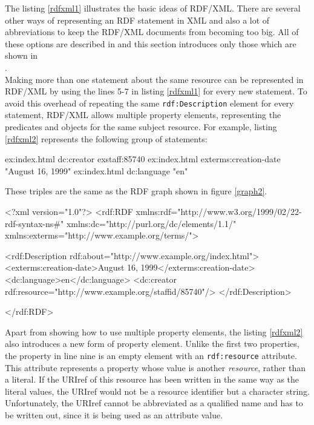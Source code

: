 \documentclass[11pt,a4paper,headsepline, bibtotoc]{scrreprt}
\begin{document}
The listing \ref{rdfxml1} illustrates the basic ideas of RDF/XML. There are several other ways of representing an RDF statement in XML and also a lot of abbreviations to keep the RDF/XML documents from becoming too big. All of these options are described in \cite{RDF:Syntax} and this section introduces only those which are shown in \\\cite{RDF:Primer}.
\\
Making more than one statement about the same resource can be represented in RDF/XML by using the lines 5-7 in listing \ref{rdfxml1} for every new statement. To avoid this overhead of repeating the same \texttt{rdf:Description} element for every statement, RDF/XML allows multiple property elements, representing the predicates and objects for the same subject resource. For example, listing \ref{rdfxml2} represents the following group of statements:
\begin{blank}
ex:index.html   dc:creator              exstaff:85740
ex:index.html   exterms:creation-date   "August 16, 1999"
ex:index.html   dc:language             "en"
\end{blank}
These triples are the same as the RDF graph shown in figure \ref{graph2}.
\begin{xmlnb}[caption={Multiple Properties},label={rdfxml2}]
<?xml version="1.0"?>
<rdf:RDF xmlns:rdf="http://www.w3.org/1999/02/22-rdf-syntax-ns#"
            xmlns:dc="http://purl.org/dc/elements/1.1/"
            xmlns:exterms="http://www.example.org/terms/">
    
  <rdf:Description rdf:about="http://www.example.org/index.html">
    <exterms:creation-date>August 16, 1999</exterms:creation-date>
    <dc:language>en</dc:language>
    <dc:creator rdf:resource="http://www.example.org/staffid/85740"/>
  </rdf:Description>

</rdf:RDF>
\end{xmlnb}
Apart from showing how to use multiple property elements, the listing \ref{rdfxml2} also introduces a new form of property element. Unlike the first two properties, the property in line nine is an empty element with an \texttt{rdf:resource} attribute. This attribute represents a property whose value is another \textit{resource}, rather than a literal. If the URIref of this resource has been written in the same way as the literal values, the URIref would not be a resource identifier but a character string. Unfortunately, the URIref cannot be abbreviated as a qualified name and has to be written out, since it is being used as an attribute value.\\
\end{document}
